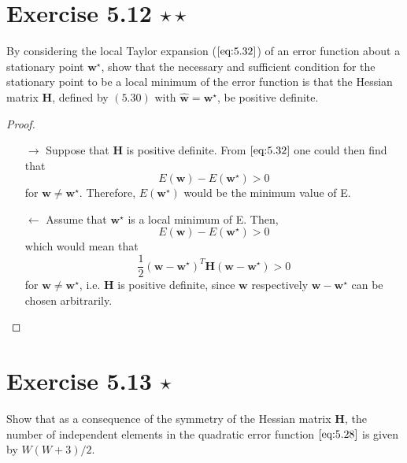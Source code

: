 \section*{Exercise 5.12 $\star \star$}
By considering the local Taylor expansion ($\ref{eq:5.32}$) of
an error function about a stationary point $\mathbf{w}^\star$, show
that the necessary and sufficient condition for the stationary point to be 
a local minimum of the error function is that the Hessian matrix
$\mathbf{H}$, defined by $(5.30)$ with $\widehat{\mathbf{w}} = \mathbf{w}^\star$,
be positive definite.

\vspace{1em}

\begin{proof}
    $ $
    \begin{enumerate}
        \item [$\to$] Suppose that $\mathbf{H}$ is positive definite. From
            $\eqref{eq:5.32}$ one could then find that
             \[
                 E(\mathbf{w}) - E(\mathbf{w}^\star) > 0
            \] 
            for $\mathbf{w} \neq  \mathbf{w}^\star$. Therefore, $E(\mathbf{w}^\star)$
            would be the minimum value of E.
        \vspace{1em}
        \item [$\leftarrow$] Assume that $\mathbf{w}^\star$
            is a local minimum of E. Then,
            \[
                E(\mathbf{w}) -E(\mathbf{w}^\star) > 0
            \]
            which would mean that 
            \[
                \frac{1}{2} (\mathbf{w} - \mathbf{w}^\star)^T \mathbf{H}
                (\mathbf{w} - \mathbf{w}^\star) > 0
            \] 
            for $\mathbf{w} \neq \mathbf{w}^\star$, i.e.
            $\mathbf{H}$ is positive definite, since
            $\mathbf{w}$ respectively $\mathbf{w} - \mathbf{w}^\star$
            can be chosen arbitrarily.
    \end{enumerate}
\end{proof}

\section*{Exercise 5.13 $\star$}
Show that as a consequence of the symmetry of the Hessian matrix $\mathbf{H}$,
the number of independent elements in the quadratic error function $\eqref{eq:5.28}$ 
is given by $W(W + 3)/2$.

\vspace{1em}

